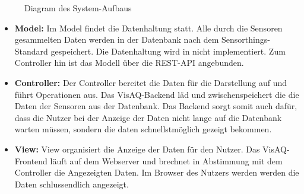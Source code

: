 \begin{figure}
    \caption{Diagram des System-Aufbaus}
\end{figure}
\begin{itemize}
    \item \textbf{Model:} Im Model findet die Datenhaltung statt. Alle durch die Sensoren gesammelten Daten werden in der Datenbank nach dem Sensorthings-Standard gespeichert. Die Datenhaltung wird in \softwarename nicht implementiert.
        Zum Controller hin ist das Modell über die REST-API angebunden.
    \item \textbf{Controller:} Der Controller bereitet die Daten für die Darstellung auf und führt Operationen aus.
        Das VisAQ-Backend läd und zwischenspeichert die die Daten der Sensoren aus der Datenbank. Das Backend sorgt somit auch dafür, dass die Nutzer bei der Anzeige der Daten nicht lange auf die Datenbank warten müssen, sondern die daten schnellstmöglich gezeigt bekommen.

    \item \textbf{View:} View organisiert die Anzeige der Daten für den Nutzer.
        Das VisAQ-Frontend läuft auf dem Webserver und brechnet in Abstimmung mit dem Controller die Angezeigten Daten.
        Im Browser des Nutzers werden werden die Daten schlussendlich angezeigt.
\end{itemize}